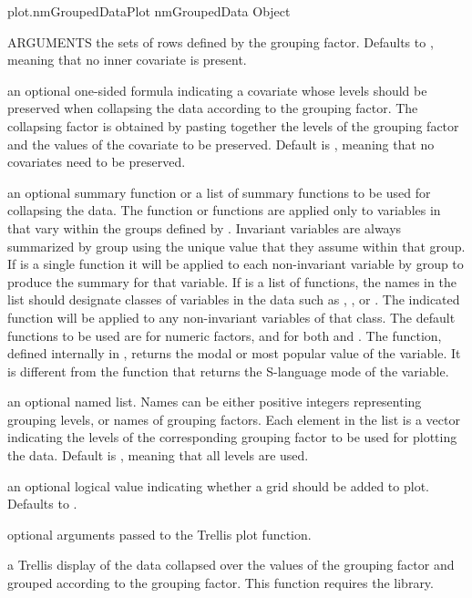 \documentclass[pdftex]{article} \usepackage{url,graphicx}
\begin{document}
\begin{Helpfile}{plot.nmGroupedData}{Plot nmGroupedData Object}
\begin{Argument}{ARGUMENTS}
the sets of rows defined by the grouping  factor. Defaults to
, meaning that no inner covariate  is present.  
\item[\Co{preserve:}]
an optional one-sided formula indicating a covariate
whose levels should be preserved when collapsing the data according
to the  grouping factor. The collapsing factor is
obtained by pasting together the levels of the 
grouping factor and the values of the covariate to be
preserved. Default is , meaning that no covariates need to
be preserved.
\item[\Co{FUN:}]
an optional summary function or a list of summary functions
to be used for collapsing the data.  The function or functions are
applied only to variables in  that vary within the
groups defined by .  Invariant variables are 
always summarized by group using the unique value that they assume
within that group.  If  is a single
function it will be applied to each non-invariant variable by group
to produce the summary for that variable.  If  is a list of
functions, the names in the list should designate classes of
variables in the data such as , , or
.  The indicated function will be applied to any
non-invariant variables of that class.  The default functions to be
used are  for numeric factors, and  for both
 and .  The  function, defined
internally in , returns the modal or most popular
value of the variable.  It is different from the  function
that returns the S-language mode of the variable.
\item[\Co{subset:}]
an optional named list. Names can be either positive
integers representing grouping levels, or names of grouping
factors. Each element in the list is a vector indicating the levels
of the corresponding grouping factor to be used for plotting the
data. Default is , meaning that all levels are
used.
\item[\Co{grid:}]
an optional logical value indicating whether a grid should
be added to plot. Defaults to .
\item[\Co{...:}]
optional arguments passed to the Trellis plot function.
\end{Argument}
a Trellis display of the data collapsed over the values of the
 grouping factor and grouped according to the
 grouping factor.
 This function requires the  library.

\end{Helpfile}
\end{document}
